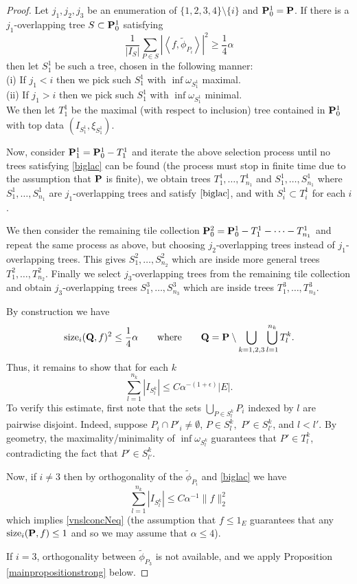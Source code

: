 \documentclass[12pt]{amsart}
\numberwithin{equation}{section}
\def\P{{\bf P}}
\def\Q{{\bf Q}}
\def\<{\left<}
\def\>{\right>}
\newcommand {\size}{\mathrm{size}}
\newcommand {\tphi}{\tilde{\phi}}
\begin{document}
\begin{proof}
Let $j_1, j_2, j_3$ be an enumeration of $\{1,2,3,4\} \setminus \{i\}$
and $\P_0^1 = \P$. If there is a $j_1$-overlapping tree $S \subset \P^1_0$ satisfying 
\begin{equation} \label{biglac}
\frac{1}{|I_{S}|}\sum_{P \in S}|\<f,\tphi_{P_i}\>|^2 \geq \frac{1}{4} \alpha 
\end{equation}
then let $S_1^1$ be such a tree, chosen in the following manner:\\
\indent (i) If $j_1 < i$ then we pick such $S_1^1$ with $\inf \omega_{S_1^1}$ maximal. \\
\indent (ii) If $j_1 > i$ then we pick such $S_1^1$ with $\inf \omega_{S_1^1}$ minimal.\\   
We then let $T_1^1$ be the maximal (with respect to inclusion) tree contained in $\P^1_0$ with top data $(I_{S_1^1},\xi_{S_1^1})$. 

Now, consider $\P_1^1 = \P_0^1 - T_1^1$ and iterate the above selection process until no trees satisfying \eqref{biglac} can be found (the process must stop in finite time due to the assumption that $\P$ is finite), we obtain trees $T_1^1, \ldots, T_{n_1}^1$ and $S_1^1, \ldots, S_{n_1}^1$ where $S_1^1, \ldots, S_{n_1}^1$ are $j_1$-overlapping trees and satisfy $\eqref{biglac}$, and with $S_{i}^1 \subset T_{i}^1$ for each $i$ .  

We then consider the remaining tile collection $\P_0^2 = \P_0^1 - T_1^1 - \dots - T_{n_1}^1$ and repeat the same process as above, but choosing $j_2$-overlapping trees instead of $j_1$-overlapping trees. This gives $S_1^2, \ldots, S_{n_2}^2$ which are inside more general trees $T_1^2, \ldots, T_{n_2}^2$. Finally we select $j_3$-overlapping trees from the remaining tile collection and  obtain $j_3$-overlapping trees $S_1^3, \ldots, S_{n_3}^3$ which are inside trees $T_1^3, \ldots, T_{n_3}^3$.

By construction we have
\[
\size_i(\Q, f)^2 \leq \frac{1}{4} \alpha 
\qquad \text{where} \qquad \Q = \P \setminus \bigcup_{k = 1,2,3} \bigcup_{l = 1}^{n_k}T_{l}^k.
\]
Thus, it remains to show that for each $k$
\[
\sum_{l=1}^{n_k} |I_{S_l^k}| \leq C \alpha^{-(1 + \epsilon)} |E|.
\]
To verify this estimate, first note that the sets $\bigcup_{P \in S_l^k} P_i$ indexed by $l$ are pairwise disjoint. Indeed, suppose $P_i \cap P'_i \neq \emptyset$, $P \in S_l^k,$ $P' \in S_{l'}^k$, and $l < l'$. By geometry, the maximality/minimality of $\inf \omega_{S_l^k}$ guarantees that $P' \in T_l^k$, contradicting the fact that $P' \in S_{l'}^k.$ 

Now, if $i\ne 3$ then by orthogonality of the $\tphi_{P_i}$ and \eqref{biglac} we have
\[
\sum_{l=1}^{n_k} |I_{S_l^k}| \leq C \alpha^{-1} \|f\|_{2}^{2}
\]  
which implies \eqref{vnslconcNeq} (the assumption that $f \leq 1_E$ guarantees that any $\size_i(\P,f) \leq 1$ and so we may assume that $\alpha \leq 4$).

If $i=3$, orthogonality between $\tphi_{P_3}$ is not available, and we apply Proposition \ref{mainpropositionstrong} below. 
\end{proof}
\end{document}
